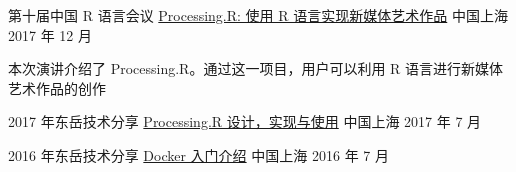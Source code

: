 \begin{cventries}
  \cventry
    {第十届中国 R 语言会议}
    {\href{http://slides.com/gaocegege/processing-r}{
      Processing.R: 使用 R 语言实现新媒体艺术作品}}
    {中国上海} %
    {2017 年 12 月} %
    {
      \begin{cvitems} %
        \item {
          本次演讲介绍了 Processing.R。通过这一项目，用户可以利用 R 语言进行新媒体艺术作品的创作
        }
      \end{cvitems}
    }

  \cventry
    {2017 年东岳技术分享}
    {\href{https://docs.google.com/presentation/d/1ylRT4VvydWbR7SyTQzNZOLpkXtgSZJiEl5nmXY1KuJw/edit?usp=sharing}{Processing.R 设计，实现与使用}}
    {中国上海} %
    {2017 年 7 月} %
    {
    }

  \cventry
    {2016 年东岳技术分享}
    {\href{https://docs.google.com/presentation/d/1Ru4Dm9TLoyxnJgFqvsCHrb82VT622H-zBSgAe1vJL44/edit?usp=sharing}{Docker 入门介绍}}
    {中国上海} %
    {2016 年 7 月} %
    {
    }

\end{cventries}
